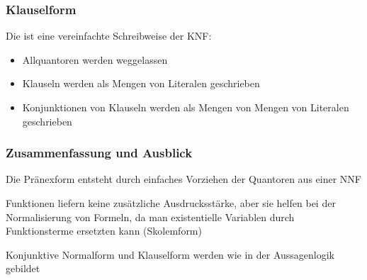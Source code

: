 \documentclass[onlymath]{beamer}
\begin{document}
\begin{frame}\frametitle{Klauselform}

Die  ist eine vereinfachte Schreibweise der KNF:
\begin{itemize}
\item Allquantoren werden weggelassen
\item Klauseln werden als Mengen von Literalen geschrieben
\item Konjunktionen von Klauseln werden als Mengen von Mengen von Literalen geschrieben
\end{itemize}


\end{frame}






\begin{frame}\frametitle{Zusammenfassung und Ausblick}

Die Pränexform entsteht durch einfaches Vorziehen der Quantoren aus einer NNF\bigskip

Funktionen liefern keine zusätzliche Ausdrucksstärke, aber sie helfen bei der
Normalisierung von Formeln, da man existentielle Variablen durch Funktionsterme ersetzten kann (Skolemform)
\bigskip

Konjunktive Normalform und Klauselform werden wie in der Aussagenlogik gebildet
\bigskip


\end{frame}
\end{document}
